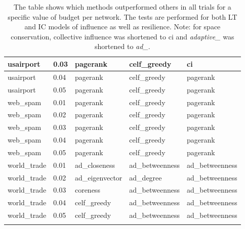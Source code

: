 \begin{longtable}[c]{|l|l|l|l|l|}
	usairport        & 0.03            & pagerank               & celf\_greedy           & ci                  \\ \hline
	usairport        & 0.04            & pagerank               & celf\_greedy           & pagerank            \\ \hline
	usairport        & 0.05            & pagerank               & celf\_greedy           & pagerank            \\ \hline
	web\_spam        & 0.01            & pagerank               & celf\_greedy           & pagerank            \\ \hline
	web\_spam        & 0.02            & pagerank               & celf\_greedy           & pagerank            \\ \hline
	web\_spam        & 0.03            & pagerank               & celf\_greedy           & pagerank            \\ \hline
	web\_spam        & 0.04            & pagerank               & celf\_greedy           & pagerank            \\ \hline
	web\_spam        & 0.05            & pagerank               & celf\_greedy           & pagerank            \\ \hline
	world\_trade     & 0.01            & ad\_closeness          & ad\_betweenness        & ad\_betweenness     \\ \hline
	world\_trade     & 0.02            & ad\_eigenvector        & ad\_degree             & ad\_betweenness     \\ \hline
	world\_trade     & 0.03            & coreness               & ad\_betweenness        & ad\_betweenness     \\ \hline
	world\_trade     & 0.04            & celf\_greedy           & ad\_betweenness        & ad\_betweenness     \\ \hline
	world\_trade     & 0.05            & celf\_greedy           & ad\_betweenness        & ad\_betweenness     \\ \hline
	\caption[All results of all IMine trials]{The table shows which methods outperformed others in all trials for a specific value of budget per network. The tests are performed for both LT and IC models of influence as well as resilience. Note: for space conservation, collective influence was shortened to ci and \textit{adaptive\_} was shortened to \textit{ad\_}.}
	\label{tab:inf-influential} \\
\end{longtable}